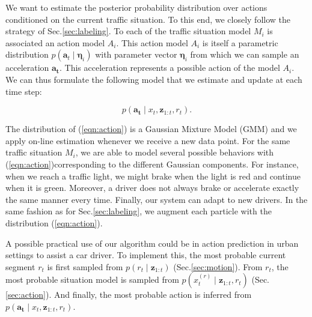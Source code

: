 We want to estimate the posterior probability distribution over actions
conditioned on the current traffic situation. To this end, we closely follow the
strategy of Sec.\ref{sec:labeling}. To each of the traffic situation model $M_i$
is associated an action model $A_i$. This action model $A_i$ is itself a
parametric distribution $p(\mathbf{a}_t\mid\boldsymbol{\eta}_i)$ with parameter
vector $\boldsymbol{\eta}_i$ from which we can sample an acceleration
$\mathbf{a_t}$. This acceleration represents a possible action of the model
$A_i$. We can thus formulate the following model that we estimate and update
at each time step:

\begin{equation}
\label{eqn:action}
p(\mathbf{a_t} \mid x_t,\mathbf{z}_{1:t},r_t).
\end{equation}

The distribution of (\ref{eqn:action}) is a Gaussian Mixture Model (GMM) and
we apply on-line estimation whenever we receive a new data point. For the same
traffic situation $M_i$, we are able to model several possible behaviors
with (\ref{eqn:action})corresponding to the different Gaussian components. For
instance, when we reach a traffic light, we might brake when the light is red
and continue when it is green. Moreover, a driver does not always brake or
accelerate exactly the same manner every time. Finally, our system can adapt
to new drivers. In the same fashion as for Sec.\ref{sec:labeling}, we augment
each particle with the distribution (\ref{eqn:action}).

A possible practical use of our algorithm could be in action prediction in
urban settings to assist a car driver. To implement this, the most probable
current segment $r_t$ is first sampled from $p(r_t\mid \mathbf{z}_{1:t})$
(Sec.\ref{sec:motion}). From $r_t$, the most probable situation model is
sampled from $p(x_t^{(r)}\mid \mathbf{z}_{1:t},r_t)$ (Sec.\ref{sec:action}). And
finally, the most probable action is inferred from
$p(\mathbf{a_t} \mid x_t,\mathbf{z}_{1:t},r_t)$.
